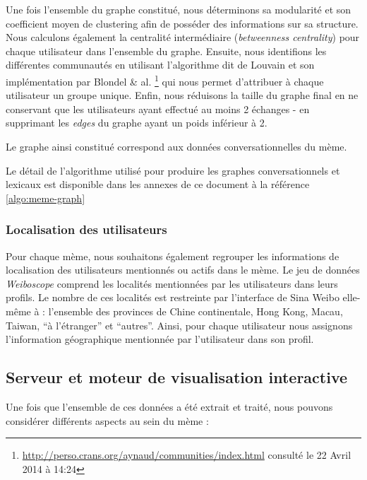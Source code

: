 Une fois l{\textquoteright}ensemble du graphe constitué, nous
déterminons sa modularité et son coefficient moyen de clustering
afin de posséder des informations sur sa structure. Nous calculons
également la centralité intermédiaire (\textit{betweenness
centrality}) pour chaque utilisateur dans l{\textquoteright}ensemble du
graphe. Ensuite, nous identifions les différentes communautés en
utilisant l{\textquoteright}algorithme dit de Louvain et son
implémentation par Blondel \& al. \citep{Blondel2008}\footnote{
\url{http://perso.crans.org/aynaud/communities/index.html} consulté
le 22 Avril 2014 à 14:24} qui nous permet d{\textquoteright}attribuer
à chaque utilisateur un groupe unique. Enfin, nous réduisons la
taille du graphe final en ne conservant que les utilisateurs ayant
effectué au moins 2 échanges - en supprimant les \textit{edges} du
graphe ayant un poids inférieur à 2.

Le graphe ainsi constitué correspond aux données conversationnelles
du mème.

Le détail de l'algorithme utilisé pour produire les graphes conversationnels et lexicaux est disponible dans les annexes de ce document à la référence \ref{algo:meme-graph}

\subsubsection{Localisation des utilisateurs}

Pour chaque mème, nous souhaitons également regrouper les
informations de localisation des utilisateurs mentionnés ou actifs
dans le mème. Le jeu de données \textit{Weiboscope }comprend les
localités mentionnées par les utilisateurs dans leurs profils. Le
nombre de ces localités est restreinte par
l{\textquoteright}interface de Sina Weibo elle-m\^eme à :
l{\textquoteright}ensemble des provinces de Chine continentale, Hong
Kong, Macau, Taiwan, {\textquotedblleft}à
l{\textquoteright}étranger{\textquotedblright} et
{\textquotedblleft}autres{\textquotedblright}. Ainsi, pour chaque
utilisateur nous assignons l{\textquoteright}information géographique
mentionnée par l{\textquoteright}utilisateur dans son profil.

\subsection{Serveur et moteur de visualisation interactive}

Une fois que l{\textquoteright}ensemble de ces données a été extrait et traité, nous pouvons considérer différents aspects au sein du mème :

